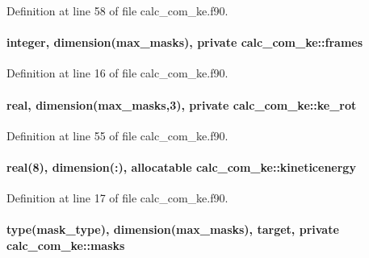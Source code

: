 Definition at line 58 of file calc\-\_\-com\-\_\-ke.\-f90.

\hypertarget{classcalc__com__ke_a1d9d59d1dc719a2be09f5b5484fdb8b1}{
\paragraph[{frames}]{\setlength{\rightskip}{0pt plus 5cm}integer, dimension({\bf max\-\_\-masks}), private calc\-\_\-com\-\_\-ke\-::frames\hspace{0.3cm}{\ttfamily [private]}}}\label{classcalc__com__ke_a1d9d59d1dc719a2be09f5b5484fdb8b1}


Definition at line 16 of file calc\-\_\-com\-\_\-ke.\-f90.

\hypertarget{classcalc__com__ke_ab6b98a0e1a1174c347a566ee87d6968f}{
\paragraph[{ke\-\_\-rot}]{\setlength{\rightskip}{0pt plus 5cm}real, dimension({\bf max\-\_\-masks},3), private calc\-\_\-com\-\_\-ke\-::ke\-\_\-rot\hspace{0.3cm}{\ttfamily [private]}}}\label{classcalc__com__ke_ab6b98a0e1a1174c347a566ee87d6968f}


Definition at line 55 of file calc\-\_\-com\-\_\-ke.\-f90.

\hypertarget{classcalc__com__ke_a248bef710a3fedc054f7af9a972aaa5f}{
\paragraph[{kineticenergy}]{\setlength{\rightskip}{0pt plus 5cm}real(8), dimension(\-:), allocatable calc\-\_\-com\-\_\-ke\-::kineticenergy}}\label{classcalc__com__ke_a248bef710a3fedc054f7af9a972aaa5f}


Definition at line 17 of file calc\-\_\-com\-\_\-ke.\-f90.

\hypertarget{classcalc__com__ke_a41821b7546d671ba29964180d9d536ed}{
\paragraph[{masks}]{\setlength{\rightskip}{0pt plus 5cm}type(mask\-\_\-type), dimension({\bf max\-\_\-masks}), target, private calc\-\_\-com\-\_\-ke\-::masks\hspace{0.3cm}{\ttfamily [private]}}}\label{classcalc__com__ke_a41821b7546d671ba29964180d9d536ed}



